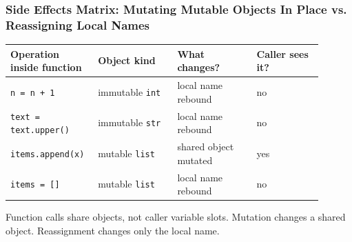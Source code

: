 \subsubsection{Side Effects Matrix: Mutating Mutable Objects In Place vs. Reassigning Local Names}

\begin{center}
\begin{tabular}{|p{0.22\linewidth}|p{0.24\linewidth}|p{0.24\linewidth}|p{0.20\linewidth}|}
\hline
\textbf{Operation inside function} & \textbf{Object kind} & \textbf{What changes?} & \textbf{Caller sees it?} \\
\hline
\texttt{n = n + 1} & immutable \texttt{int} & local name rebound & no \\
\hline
\texttt{text = text.upper()} & immutable \texttt{str} & local name rebound & no \\
\hline
\texttt{items.append(x)} & mutable \texttt{list} & shared object mutated & yes \\
\hline
\texttt{items = []} & mutable \texttt{list} & local name rebound & no \\
\hline
\end{tabular}
\end{center}

Function calls share objects, not caller variable slots. Mutation changes a shared object. Reassignment changes only the local name.
